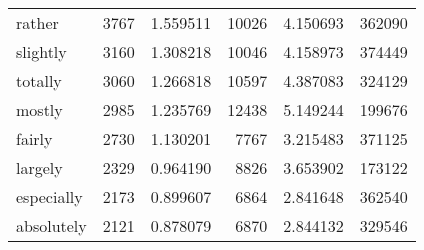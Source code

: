 \begin{table}[ht]
\begin{tabular}{lrrrrr}
rather & {\cellcolor[HTML]{831A83}} \color[HTML]{F1F1F1} 3767 & {\cellcolor[HTML]{831A83}} \color[HTML]{F1F1F1} 1.559511 & {\cellcolor[HTML]{8B5EAB}} \color[HTML]{F1F1F1} 10026 & {\cellcolor[HTML]{8B5EAB}} \color[HTML]{F1F1F1} 4.150693 & {\cellcolor[HTML]{C2D5E7}} \color[HTML]{000000} 362090 \\
slightly & {\cellcolor[HTML]{894FA3}} \color[HTML]{F1F1F1} 3160 & {\cellcolor[HTML]{894FA3}} \color[HTML]{F1F1F1} 1.308218 & {\cellcolor[HTML]{8B5EAB}} \color[HTML]{F1F1F1} 10046 & {\cellcolor[HTML]{8B5EAB}} \color[HTML]{F1F1F1} 4.158973 & {\cellcolor[HTML]{C0D4E6}} \color[HTML]{000000} 374449 \\
totally & {\cellcolor[HTML]{8A56A7}} \color[HTML]{F1F1F1} 3060 & {\cellcolor[HTML]{8A56A7}} \color[HTML]{F1F1F1} 1.266818 & {\cellcolor[HTML]{8A51A5}} \color[HTML]{F1F1F1} 10597 & {\cellcolor[HTML]{8A51A5}} \color[HTML]{F1F1F1} 4.387083 & {\cellcolor[HTML]{C9DBEA}} \color[HTML]{000000} 324129 \\
mostly & {\cellcolor[HTML]{8B5CAA}} \color[HTML]{F1F1F1} 2985 & {\cellcolor[HTML]{8B5CAA}} \color[HTML]{F1F1F1} 1.235769 & {\cellcolor[HTML]{842289}} \color[HTML]{F1F1F1} 12438 & {\cellcolor[HTML]{842289}} \color[HTML]{F1F1F1} 5.149244 & {\cellcolor[HTML]{DFEBF4}} \color[HTML]{000000} 199676 \\
fairly & {\cellcolor[HTML]{8C70B3}} \color[HTML]{F1F1F1} 2730 & {\cellcolor[HTML]{8C70B3}} \color[HTML]{F1F1F1} 1.130201 & {\cellcolor[HTML]{8C94C5}} \color[HTML]{F1F1F1} 7767 & {\cellcolor[HTML]{8C94C5}} \color[HTML]{F1F1F1} 3.215483 & {\cellcolor[HTML]{C1D4E7}} \color[HTML]{000000} 371125 \\
largely & {\cellcolor[HTML]{8C8FC2}} \color[HTML]{F1F1F1} 2329 & {\cellcolor[HTML]{8C8FC2}} \color[HTML]{F1F1F1} 0.964190 & {\cellcolor[HTML]{8C7AB8}} \color[HTML]{F1F1F1} 8826 & {\cellcolor[HTML]{8C7AB8}} \color[HTML]{F1F1F1} 3.653902 & {\cellcolor[HTML]{E2EDF5}} \color[HTML]{000000} 173122 \\
especially & {\cellcolor[HTML]{8E9AC8}} \color[HTML]{F1F1F1} 2173 & {\cellcolor[HTML]{8E9AC8}} \color[HTML]{F1F1F1} 0.899607 & {\cellcolor[HTML]{94A6CE}} \color[HTML]{F1F1F1} 6864 & {\cellcolor[HTML]{94A6CE}} \color[HTML]{F1F1F1} 2.841648 & {\cellcolor[HTML]{C2D5E7}} \color[HTML]{000000} 362540 \\
absolutely & {\cellcolor[HTML]{909ECA}} \color[HTML]{F1F1F1} 2121 & {\cellcolor[HTML]{909ECA}} \color[HTML]{F1F1F1} 0.878079 & {\cellcolor[HTML]{94A6CE}} \color[HTML]{F1F1F1} 6870 & {\cellcolor[HTML]{94A6CE}} \color[HTML]{F1F1F1} 2.844132 & {\cellcolor[HTML]{C8DAEA}} \color[HTML]{000000} 329546 \\

\end{tabular}
\end{table}
